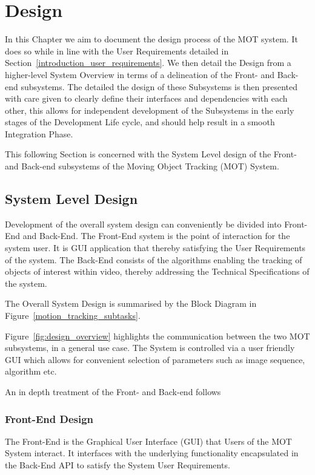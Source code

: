 \chapter{Design}\label{chapter_design}
In this Chapter we aim to document the design process of the MOT system. It does so
while in line with the User Requirements detailed in 
Section~\ref{introduction_user_requirements}. 
We then detail the Design from a higher-level System Overview in terms of a
delineation of the Front- and Back-end subsystems. The detailed the design of
these Subsystems is then presented with care given to clearly define their
interfaces and dependencies with each other, this allows for independent
development of the Subsystems in the early stages of the Development Life cycle,
and should help result in a smooth Integration Phase.

This following Section is concerned with the System Level design of the
Front- and Back-end subsystems of the Moving Object Tracking (MOT) System.

\section{System Level Design}
Development of the overall system design can conveniently be divided into
Front-End and Back-End. The Front-End system is the point of interaction for the
system user. It is GUI application that thereby satisfying the User Requirements
of the system. The Back-End consists of the algorithms enabling the tracking of
objects of interest within video, thereby addressing the Technical
Specifications of the system.

The Overall System Design is summarised by the Block Diagram in
Figure~\ref{motion_tracking_subtasks}.  


Figure~\ref{fig:design_overview} highlights the communication between the two MOT
subsystems, in a general use case. The System is controlled via a user
friendly GUI which allows for convenient selection of parameters such as
image sequence, algorithm etc.

An in depth treatment of the Front- and Back-end follows

\subsection{Front-End Design}
The Front-End is the Graphical User Interface (GUI) that Users of the MOT
System interact. 
It interfaces with the underlying functionality encapsulated in the Back-End API to
satisfy the System User Requirements. 

